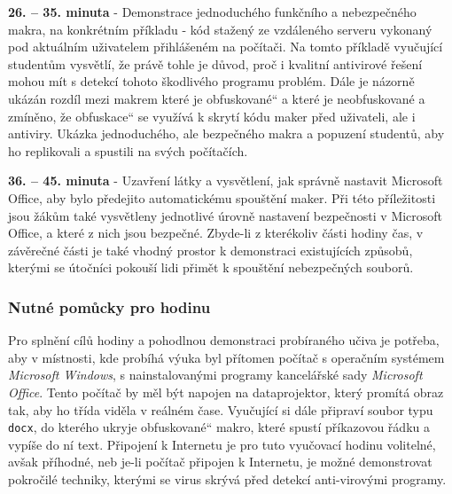\documentclass[a4paper, 12pt]{article}
\providecommand{\uv}[1]{\quotedblbase #1\textquotedblleft}
\begin{document}
\textbf{26. -- 35. minuta} - Demonstrace jednoduchého funkčního a nebezpečného makra, na konkrétním příkladu - kód stažený ze vzdáleného serveru vykonaný pod aktuálním uživatelem přihlášeném na počítači. Na tomto příkladě vyučující studentům vysvětlí, že právě tohle je důvod, proč i kvalitní antivirové řešení mohou mít s detekcí tohoto škodlivého programu problém. Dále je názorně ukázán rozdíl mezi makrem které je \uv{obfuskované} a které je neobfuskované a zmíněno, že \uv{obfuskace} se využívá k skrytí kódu maker před uživateli, ale i antiviry. Ukázka jednoduchého, ale bezpečného makra a popuzení studentů, aby ho replikovali a spustili na svých počítačích.

\textbf{36. -- 45. minuta} - Uzavření látky a vysvětlení, jak správně nastavit Microsoft Office, aby bylo předejito automatickému spouštění maker. Při této příležitosti jsou žákům také vysvětleny jednotlivé úrovně nastavení bezpečnosti v Microsoft Office, a které z nich jsou bezpečné. Zbyde-li z kterékoliv části hodiny čas, v závěrečné části je také vhodný prostor k demonstraci existujících způsobů, kterými se útočníci pokouší lidi přimět k spouštění nebezpečných souborů. 

\subsubsection{Nutné pomůcky pro hodinu}
Pro splnění cílů hodiny a pohodlnou demonstraci probíraného učiva je potřeba, aby v místnosti, kde probíhá výuka byl přítomen počítač s operačním systémem \textit{Microsoft Windows}, s nainstalovanými programy kancelářské sady \textit{Microsoft Office}. Tento počítač by měl být napojen na dataprojektor, který promítá obraz tak, aby ho třída viděla v reálném čase. Vyučující si dále připraví soubor typu \texttt{docx}, do kterého ukryje \uv{obfuskované} makro, které spustí příkazovou řádku a vypíše do ní text. Připojení k Internetu je pro tuto vyučovací hodinu volitelné, avšak příhodné, neb je-li počítač připojen k Internetu, je možné demonstrovat pokročilé techniky, kterými se virus skrývá před detekcí anti-virovými programy.

\newpage
\end{document}
